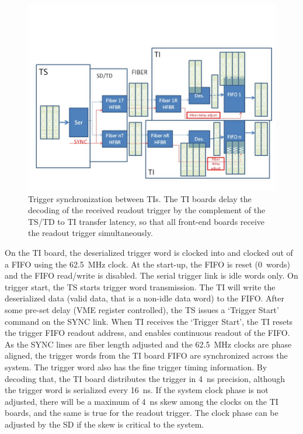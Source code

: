 \begin{figure}[hbt]
	\centering
	\includegraphics[width=1.0\columnwidth,keepaspectratio]{img/TrgSync.jpg}
	\caption{Trigger synchronization between TIs.  The TI boards delay the decoding of the received readout trigger
          by the complement of the TS/TD to TI transfer latency, so that all front-end boards receive the readout
          trigger simultaneously.}
	\label{fig:TIsync}
\end{figure}

On the TI board, the deserialized trigger word is clocked into and clocked out of a FIFO using the 62.5~MHz clock. At
the start-up, the FIFO is reset (0~words) and the FIFO read/write is disabled. The serial trigger link is idle words only.
On trigger start, the TS starts trigger word transmission.  The TI will write the deserialized data (valid data, that is a
non-idle data word) to the FIFO.  After some pre-set delay (VME register controlled), the TS issues a ‘Trigger Start’
command on the SYNC link.  When TI receives the ‘Trigger Start’, the TI resets the trigger FIFO readout address, and
enables continuous readout of the FIFO.  As the SYNC lines are fiber length adjusted and the 62.5~MHz clocks are phase
aligned, the trigger words from the TI board FIFO are synchronized across the system. The trigger word also has the
fine trigger timing information.  By decoding that, the TI board distributes the trigger in 4~ns precision, although the
trigger word is serialized every 16~ns.  If the system clock phase is not adjusted, there will be a maximum of 4~ns skew
among the clocks on the TI boards, and the same is true for the readout trigger.  The clock phase can be adjusted by the
SD if the skew is critical to the system.

